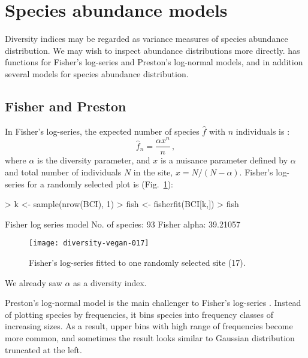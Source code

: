 \documentclass[a4paper,10pt,twocolumn]{article}
\begin{document}
\section{Species abundance models}

Diversity indices may be regarded as variance measures of species
abundance distribution.  We may wish to inspect abundance
distributions more directly.   has functions for
Fisher's log-series and Preston's log-normal models, and in addition
several models for species abundance distribution.

\subsection{Fisher and Preston}

In Fisher's log-series, the expected number of species $\hat f$ with $n$
individuals is \citep{FisherEtal43}:
\begin{equation}
\hat f_n = \frac{\alpha x^n}{n} \,,
\end{equation}
where $\alpha$ is the diversity parameter, and $x$ is a nuisance
parameter defined by $\alpha$ and total number
of individuals $N$ in the site, $x = N/(N-\alpha)$.  Fisher's
log-series for a randomly selected plot is (Fig.~\ref{fig:fisher}):
\begin{Schunk}
\begin{Sinput}
> k <- sample(nrow(BCI), 1)
> fish <- fisherfit(BCI[k,])
> fish
\end{Sinput}
\begin{Soutput}
Fisher log series model
No. of species: 93 
Fisher alpha:   39.21057 
\end{Soutput}
\end{Schunk}
\begin{figure}
\texttt{[image: diversity-vegan-017]}
\caption{Fisher's log-series fitted to one randomly selected site
  (17).}
\label{fig:fisher}
\end{figure}
We already saw $\alpha$ as a diversity index.

Preston's log-normal model is the main challenger to Fisher's
log-series \citep{Preston48}.  Instead of plotting species by
frequencies, it bins species into frequency classes of increasing
sizes.  As a result, upper bins with high range of frequencies become
more common, and sometimes the result looks similar to Gaussian
distribution truncated at the left.
\end{document}
